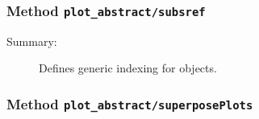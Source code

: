 \subsubsection[Method \texttt{subsref}]{Method \texttt{plot\_abstract/subsref}}%
%
\label{ref_plot_abstract__subsref}%
\hypertarget{ref_plot_abstract__subsref}{}%
\begin{description}
\item[Summary:]Defines generic indexing for objects.
%
%
%
%
%
%
%
%
\end{description}
\methodline%
\subsubsection[Method \texttt{superposePlots}]{Method \texttt{plot\_abstract/superposePlots}}%
%
\label{ref_plot_abstract__superposePlots}%
\hypertarget{ref_plot_abstract__superposePlots}{}%
